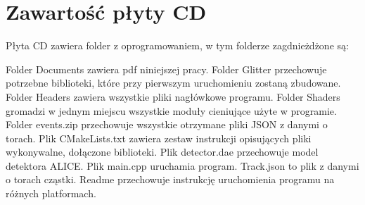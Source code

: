 \begin{appendices}
\begin{figure}[H]
    \label{rys31}
\end{figure}


\newpage
\section{Zawartość płyty CD}
Płyta CD zawiera folder z oprogramowaniem, w tym folderze zagdnieżdżone są: 
\begin{itemize}
\itemi Folder Documents zawiera pdf niniejszej pracy.
\itemi Folder Glitter przechowuje potrzebne biblioteki, które przy pierwszym uruchomieniu zostaną zbudowane.
\itemi Folder Headers zawiera wszystkie pliki nagłówkowe programu.
\itemi Folder Shaders gromadzi w jednym miejscu wszystkie moduły cieniujące użyte w programie.
\itemi Folder events.zip przechowuje wszystkie otrzymane pliki JSON z danymi o torach.
\itemi Plik CMakeLists.txt zawiera zestaw instrukcji opisujących pliki wykonywalne, dołączone biblioteki. 
\itemi Plik detector.dae przechowuje model detektora ALICE.
\itemi Plik main.cpp uruchamia program.
\itemi Track.json to plik z danymi o torach cząstki.
\itemi Readme przechowuje instrukcję uruchomienia programu na różnych platformach.
\end{itemize}

\end{appendices}



